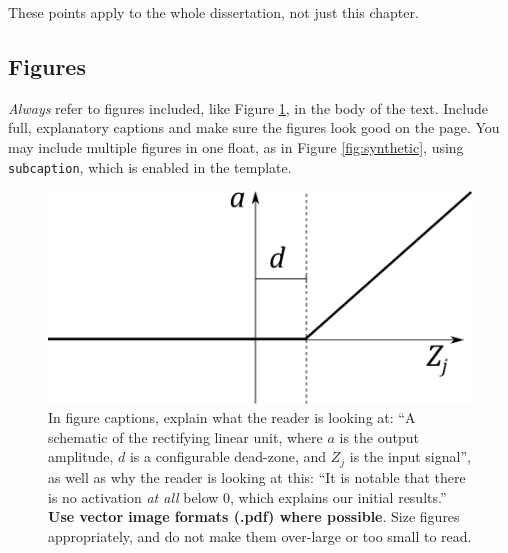 \documentclass{l4proj}
\begin{document}
These points apply to the whole dissertation, not just this chapter.



\subsection{Figures}
\emph{Always} refer to figures included, like Figure \ref{fig:relu}, in the body of the text. Include full, explanatory captions and make sure the figures look good on the page.
You may include multiple figures in one float, as in Figure \ref{fig:synthetic}, using \texttt{subcaption}, which is enabled in the template.



\begin{figure}
    \centering
    \includegraphics[width=0.5\linewidth]{images/relu.pdf}    

    \caption{In figure captions, explain what the reader is looking at: ``A schematic of the rectifying linear unit, where $a$ is the output amplitude,
    $d$ is a configurable dead-zone, and $Z_j$ is the input signal'', as well as why the reader is looking at this: 
    ``It is notable that there is no activation \emph{at all} below 0, which explains our initial results.'' 
    \textbf{Use vector image formats (.pdf) where possible}. Size figures appropriately, and do not make them over-large or too small to read.
    }

    \label{fig:relu} 
\end{figure}
\end{document}
